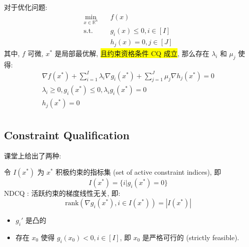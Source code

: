 \begin{theorem}
    对于优化问题:
    \begin{align*}
        \min_{x \in \mathbb{R}^n} & \quad f(x) \\
        \text{s.t.} & \quad g_i(x) \leq 0, i\in [I] \\
        & \quad h_j(x) = 0, j\in [J]
    \end{align*}
    其中, $f$ 可微, $x^*$ 是局部最优解, \colorbox{yellow}{且约束资格条件 CQ 成立}, 那么存在 $\lambda_i $ 和 $\mu_j$ 使得:
    \begin{align*}
        \nabla f(x^*) + \sum_{i=1}^I \lambda_i \nabla g_i(x^*) + \sum_{j=1}^J \mu_j \nabla h_j(x^*) = 0 \\
        \lambda_i \geq 0, g_i(x^*) \leq 0, \lambda_ig_i(x^*) = 0 \\
        h_j(x^*) = 0 \\
    \end{align*}
    \end{theorem}

\subsection{Constraint Qualification}
课堂上给出了两种:
\begin{definition}
    令 $I(x^*)$ 为 $x^*$ 积极约束的指标集 (set of active constraint indices), 即 
    $$ I(x^*) = \{i | g_i(x^*) = 0\} $$
    NDCQ : 活跃约束的梯度线性无关, 即:
    $$\text{rank} \left( \nabla g_i(x^*), i \in I(x^*) \right) = |I(x^*)|$$
\end{definition}
\begin{definition}
    \begin{itemize}
        \item $g_i'$ 是凸的
        \item 存在 $x_0$ 使得 $g_i(x_0) < 0, i \in [I]$, 即 $x_0$ 是严格可行的 (strictly feasible).
    \end{itemize}
\end{definition}

